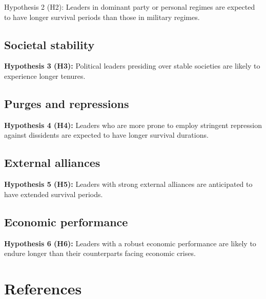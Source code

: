 \documentclass[
  12pt,
  a4paper,
  DIV=11,
  numbers=noendperiod]{scrartcl}
\begin{document}
Hypothesis 2 (H2): Leaders in dominant party or personal regimes are
expected to have longer survival periods than those in military regimes.

\hypertarget{societal-stability}{%
\subsection{Societal stability}\label{societal-stability}}

\textbf{Hypothesis 3 (H3):} Political leaders presiding over stable
societies are likely to experience longer tenures.

\hypertarget{purges-and-repressions}{%
\subsection{Purges and repressions}\label{purges-and-repressions}}

\textbf{Hypothesis 4 (H4):} Leaders who are more prone to employ
stringent repression against dissidents are expected to have longer
survival durations.

\hypertarget{external-alliances}{%
\subsection{External alliances}\label{external-alliances}}

\textbf{Hypothesis 5 (H5):} Leaders with strong external alliances are
anticipated to have extended survival periods.

\hypertarget{economic-performance}{%
\subsection{Economic performance}\label{economic-performance}}

\textbf{Hypothesis 6 (H6):} Leaders with a robust economic performance
are likely to endure longer than their counterparts facing economic
crises.

\newpage

\hypertarget{references}{%
\section*{References}\label{references}}
\end{document}

